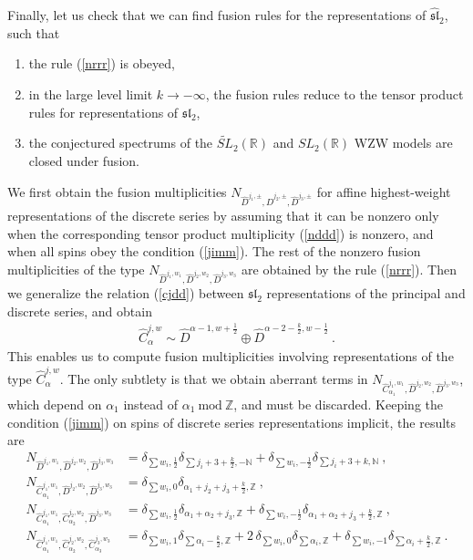\documentclass[12pt,a4paper,notitlepage]{report}
\newcommand \Z {\mathbb{Z}}
\newcommand \N {\mathbb{N}}
\numberwithin{equation}{section}
\theoremstyle{break}
\begin{document}
Finally, let us check that we can find fusion rules for the representations of $\widehat{\mathfrak{sl}}_2$, such that
\begin{enumerate}
 \item the rule (\ref{nrrr}) is obeyed,
\item in the large level limit $k\rightarrow -\infty$, the fusion rules reduce to the tensor product rules for representations of $\mathfrak{sl}_2$,
\item the conjectured spectrums of the $\widetilde{SL}_2(\mathbb{R})$ and $SL_2(\mathbb{R})$ WZW models are closed under fusion.
\end{enumerate}
We first obtain the fusion multiplicities $N_{\hat{D}^{j_1,\pm},\hat{D}^{j_2,\pm},\hat{D}^{j_3,\pm}}$ for affine highest-weight representations of the discrete series  by assuming that it can be nonzero only when the corresponding tensor product multiplicity (\ref{nddd}) is nonzero, and when all spins obey the condition (\ref{jimm}). The rest of the nonzero fusion multiplicities of the type    
$N_{\hat{D}^{j_1,w_1},\hat{D}^{j_2,w_2},\hat{D}^{j_3,w_3}}$ are obtained by the rule (\ref{nrrr}). Then we generalize the relation (\ref{cjdd}) between $\mathfrak{sl}_2$ representations of the principal and discrete series, and obtain 
\begin{align}
 \hat{C}^{j,w}_\alpha \sim \hat{D}^{\alpha-1,w+\frac12} \oplus \hat{D}^{\alpha-2-\frac{k}{2},w-\frac12} \ .
\end{align}
This enables us to compute fusion multiplicities involving representations of the type $\hat{C}^{j,w}_\alpha$. The only subtlety is that we obtain aberrant terms in $N_{\hat{C}^{j_1,w_1}_{\alpha_1},\hat{D}^{j_2,w_2},\hat{D}^{j_3,w_3}}$, which depend on $\alpha_1$ instead of $\alpha_1\ \text{mod}\ \Z$, and must be discarded. Keeping the condition (\ref{jimm}) on spins of discrete series representations implicit, the results are 
\begin{align}
 N_{\hat{D}^{j_1,w_1},\hat{D}^{j_2,w_2},\hat{D}^{j_3,w_3}} 
&= \delta_{\sum w_i,\frac12} \delta_{\sum j_i+3+\frac{k}{2},-\N} + \delta_{\sum w_i,-\frac12}\delta_{\sum j_i+3+k,\N} \ ,
\\
 N_{\hat{C}^{j_1,w_1}_{\alpha_1},\hat{D}^{j_2,w_2},\hat{D}^{j_3,w_3}} &= \delta_{\sum w_i,0} \delta_{\alpha_1+j_2+j_3+\frac{k}{2},\Z}\ ,
\\
 N_{\hat{C}^{j_1,w_1}_{\alpha_1},\hat{C}^{j_2,w_2}_{\alpha_2},\hat{D}^{j_3,w_3}} & = \delta_{\sum w_i,\frac12} \delta_{\alpha_1+\alpha_2+j_3,\Z} + \delta_{\sum w_i,-\frac12}\delta_{\alpha_1+\alpha_2+j_3+\frac{k}{2},\Z}\ ,
\\
N_{\hat{C}^{j_1,w_1}_{\alpha_1},\hat{C}^{j_2,w_2}_{\alpha_2},\hat{C}^{j_3,w_3}_{\alpha_3}} & = \delta_{\sum w_i,1}\delta_{\sum\alpha_i-\frac{k}{2},\Z} + 2\, \delta_{\sum w_i,0}\delta_{\sum \alpha_i,\Z} + \delta_{\sum w_i,-1}\delta_{\sum\alpha_i+\frac{k}{2},\Z}\ .
\end{align}
\end{document}

